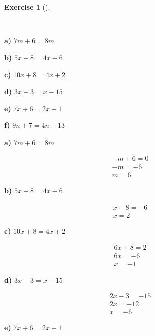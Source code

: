 \documentclass[
  letterpaper,
  DIV=11,
  numbers=noendperiod]{scrreprt}
\theoremstyle{definition}
\newtheorem{exercise}{Exercise}[chapter]
\theoremstyle{remark}
\begin{document}
\begin{exercise}[]\protect\hypertarget{exr-u5-7}{}\label{exr-u5-7}

~

\textbf{a)} \(\displaystyle 7m + 6 = 8m\)

\textbf{b)} \(\displaystyle 5x - 8 = 4x - 6\)

\textbf{c)} \(\displaystyle 10x + 8 = 4x + 2\)

\textbf{d)} \(\displaystyle 3x - 3 = x - 15\)

\textbf{e)} \(\displaystyle 7x + 6 = 2x + 1\)

\textbf{f)} \(\displaystyle 9n + 7 = 4n - 13\)

\begin{tcolorbox}[enhanced jigsaw, opacitybacktitle=0.6, coltitle=black, arc=.35mm, colframe=quarto-callout-tip-color-frame, colback=white, bottomrule=.15mm, left=2mm, colbacktitle=quarto-callout-tip-color!10!white, titlerule=0mm, opacityback=0, title=\textcolor{quarto-callout-tip-color}{\faLightbulb}\hspace{0.5em}{🔍 View Solutions}, leftrule=.75mm, breakable, rightrule=.15mm, bottomtitle=1mm, toptitle=1mm, toprule=.15mm]

\textbf{a)} \(\displaystyle 7m + 6 = 8m\)

\begin{align*}
-m + 6 = 0 \\ -m = -6 \\ m = 6
\end{align*}

\textbf{b)} \(\displaystyle 5x - 8 = 4x - 6\)

\begin{align*}
x - 8 = -6 \\ x = 2
\end{align*}

\textbf{c)} \(\displaystyle 10x + 8 = 4x + 2\)

\begin{align*}
6x + 8 = 2 \\ 6x = -6 \\ x = -1
\end{align*}

\textbf{d)} \(\displaystyle 3x - 3 = x - 15\)

\begin{align*}
2x - 3 = -15 \\ 2x = -12 \\ x = -6
\end{align*}

\textbf{e)} \(\displaystyle 7x + 6 = 2x + 1\)


\end{tcolorbox}
\end{exercise}
\end{document}
